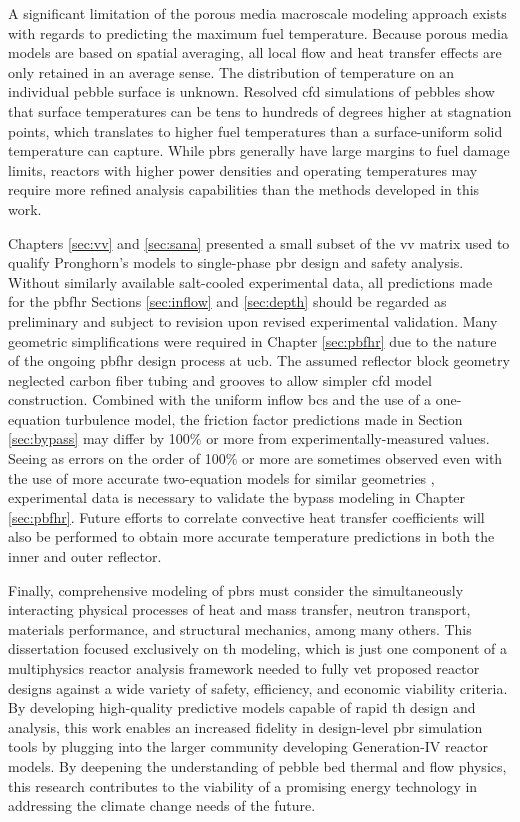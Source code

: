 A significant limitation of the porous media macroscale modeling approach exists with regards to predicting the maximum fuel temperature. Because porous media models are based on spatial averaging, all local flow and heat transfer effects are only retained in an average sense. The distribution of temperature on an individual pebble surface is unknown. Resolved \gls{cfd} simulations of pebbles show that surface temperatures can be tens to hundreds of degrees higher at stagnation points, which translates to higher fuel temperatures than a surface-uniform solid temperature can capture. While \glspl{pbr} generally have large margins to fuel damage limits, reactors with higher power densities and operating temperatures may require more refined analysis capabilities than the methods developed in this work. 

Chapters \ref{sec:vv} and \ref{sec:sana} presented a small subset of the \gls{vv} matrix used to qualify Pronghorn's models to single-phase \gls{pbr} design and safety analysis. Without similarly available salt-cooled experimental data, all predictions made for the \gls{pbfhr} Sections \ref{sec:inflow} and \ref{sec:depth} should be regarded as preliminary and subject to revision upon revised experimental validation. Many geometric simplifications were required in Chapter \ref{sec:pbfhr} due to the nature of the ongoing \gls{pbfhr} design process at \gls{ucb}. The assumed reflector block geometry neglected carbon fiber tubing and grooves to allow simpler \gls{cfd} model construction. Combined with the uniform inflow \glspl{bc} and the use of a one-equation turbulence model, the friction factor predictions made in Section \ref{sec:bypass} may differ by 100\% or more from experimentally-measured values. Seeing as errors on the order of 100\% or more are sometimes observed even with the use of more accurate two-equation models for similar geometries \cite{wyk}, experimental data is necessary to validate the bypass modeling in Chapter \ref{sec:pbfhr}. Future efforts to correlate convective heat transfer coefficients will also be performed to obtain more accurate temperature predictions in both the inner and outer reflector.

Finally, comprehensive modeling of \glspl{pbr} must consider the simultaneously interacting physical processes of heat and mass transfer, neutron transport, materials performance, and structural mechanics, among many others. This dissertation focused exclusively on \gls{th} modeling, which is just one component of a multiphysics reactor analysis framework needed to fully vet proposed reactor designs against a wide variety of safety, efficiency, and economic viability criteria. By developing high-quality predictive models capable of rapid \gls{th} design and analysis, this work enables an increased fidelity in design-level \gls{pbr} simulation tools by plugging into the larger community developing Generation-IV reactor models. By deepening the understanding of pebble bed thermal and flow physics, this research contributes to the viability of a promising energy technology in addressing the climate change needs of the future.